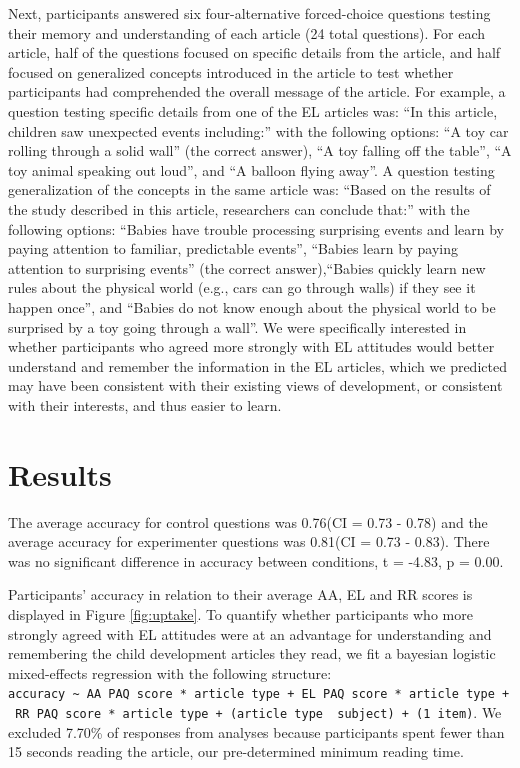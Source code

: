 \documentclass[floatsintext,man]{apa6}
\theoremstyle{definition}
\theoremstyle{definition}
\theoremstyle{definition}
\theoremstyle{remark}
\begin{document}
Next, participants answered six four-alternative forced-choice questions
testing their memory and understanding of each article (24 total
questions). For each article, half of the questions focused on specific
details from the article, and half focused on generalized concepts
introduced in the article to test whether participants had comprehended
the overall message of the article. For example, a question testing
specific details from one of the EL articles was: \enquote{In this
article, children saw unexpected events including:} with the following
options: \enquote{A toy car rolling through a solid wall} (the correct
answer), \enquote{A toy falling off the table}, \enquote{A toy animal
speaking out loud}, and \enquote{A balloon flying away}. A question
testing generalization of the concepts in the same article was:
\enquote{Based on the results of the study described in this article,
researchers can conclude that:} with the following options:
\enquote{Babies have trouble processing surprising events and learn by
paying attention to familiar, predictable events}, \enquote{Babies learn
by paying attention to surprising events} (the correct
answer),\enquote{Babies quickly learn new rules about the physical world
(e.g., cars can go through walls) if they see it happen once}, and
\enquote{Babies do not know enough about the physical world to be
surprised by a toy going through a wall}. We were specifically
interested in whether participants who agreed more strongly with EL
attitudes would better understand and remember the information in the EL
articles, which we predicted may have been consistent with their
existing views of development, or consistent with their interests, and
thus easier to learn.

\section{Results}\label{results}

The average accuracy for control questions was 0.76(CI = 0.73 - 0.78)
and the average accuracy for experimenter questions was 0.81(CI = 0.73 -
0.83). There was no significant difference in accuracy between
conditions, t = -4.83, p = 0.00.

Participants' accuracy in relation to their average AA, EL and RR scores
is displayed in Figure \ref{fig:uptake}. To quantify whether
participants who more strongly agreed with EL attitudes were at an
advantage for understanding and remembering the child development
articles they read, we fit a bayesian logistic mixed-effects regression
with the following structure:
\texttt{accuracy\ \textasciitilde{}\ AA\ PAQ\ score\ *\ article\ type\ +\ EL\ PAQ\ score\ *\ article\ type\ +\ RR\ PAQ\ score\ *\ article\ type\ +\ (article\ type\ \textbar{}\ subject)\ +\ (1\textbar{}\ item)}.
We excluded 7.70\% of responses from analyses because participants spent
fewer than 15 seconds reading the article, our pre-determined minimum
reading time.
\end{document}
